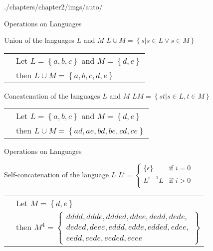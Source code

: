 \begin{graphicspathcontext}{{./chapters/chapter2/imgs/auto/}}
\begin{bibunit}[apalike]
\begin{frame}[c]{Operations on Languages}
	\begin{block}{Union of the languages $L$ and $M$}
		$L \cup M = \left\{s | s\in L \vee s \in M\right\}$
		\begin{tabularx}{\linewidth}{@{}lX@{}}
		\insertexamplelabel & Let $L = \left\{ a, b ,c \right\}$ and $M = \left\{ d, e \right\}$ \\
		& then $L \cup M = \left\{ a, b, c, d, e \right\}$
		\end{tabularx}
	\end{block}
	\begin{block}{Concatenation of the languages $L$ and $M$}
		$LM = \left\{st | s\in L, t \in M\right\}$
		\begin{tabularx}{\linewidth}{@{}lX@{}}
		\insertexamplelabel & Let $L = \left\{ a, b ,c \right\}$ and $M = \left\{ d, e \right\}$ \\
		& then $L \cup M = \left\{ ad, ae, bd, be, cd, ce \right\}$
		\end{tabularx}
	\end{block}
\end{frame}

\begin{frame}[c]{Operations on Languages}
	\begin{block}{Self-concatenation of the language $L$}
		$L^i = \begin{cases}
			\{\epsilon\} & \text{if }i=0 \\
			L^{i-1}L & \text{if }i>0 \\
			\end{cases}$
		\begin{tabularx}{\linewidth}{@{}lX@{}}
		\insertexamplelabel & Let $M = \left\{ d, e \right\}$ \\
		& then $M^4 = \left\{ \begin{array}{l}
			\scriptstyle dddd, ddde, ddded, ddee, dedd, dede, \\
			\scriptstyle deded, deee, eddd, edde, edded, edee, \\
			\scriptstyle eedd, eede, eeded, eeee \end{array} \right\}$
		\end{tabularx}
	\end{block}
\end{frame}


\end{bibunit}
\end{graphicspathcontext}
